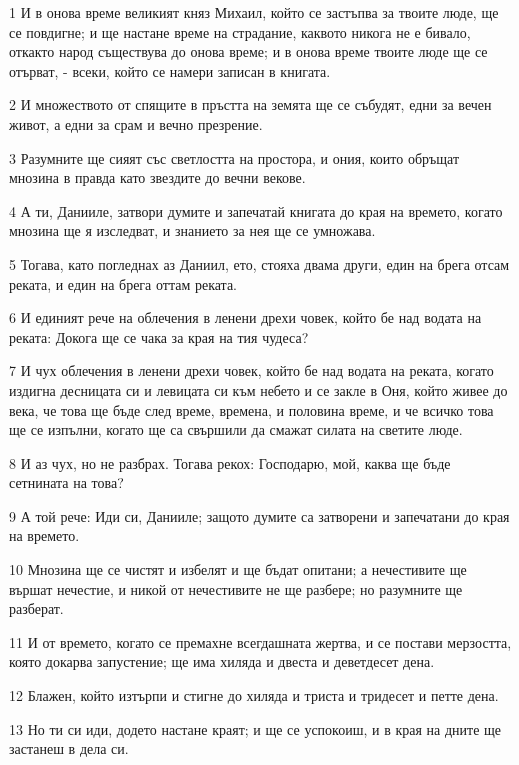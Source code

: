\par 1 И в онова време великият княз Михаил, който се застъпва за твоите люде, ще се повдигне; и ще настане време на страдание, каквото никога не е бивало, откакто народ съществува до онова време; и в онова време твоите люде ще се отърват, - всеки, който се намери записан в книгата.
\par 2 И множеството от спящите в пръстта на земята ще се събудят, едни за вечен живот, а едни за срам и вечно презрение.
\par 3 Разумните ще сияят със светлостта на простора, и ония, които обръщат мнозина в правда като звездите до вечни векове.
\par 4 А ти, Данииле, затвори думите и запечатай книгата до края на времето, когато мнозина ще я изследват, и знанието за нея ще се умножава.
\par 5 Тогава, като погледнах аз Даниил, ето, стояха двама други, един на брега отсам реката, и един на брега оттам реката.
\par 6 И единият рече на облечения в ленени дрехи човек, който бе над водата на реката: Докога ще се чака за края на тия чудеса?
\par 7 И чух облечения в ленени дрехи човек, който бе над водата на реката, когато издигна десницата си и левицата си към небето и се закле в Оня, който живее до века, че това ще бъде след време, времена, и половина време, и че всичко това ще се изпълни, когато ще са свършили да смажат силата на светите люде.
\par 8 И аз чух, но не разбрах. Тогава рекох: Господарю, мой, каква ще бъде сетнината на това?
\par 9 А той рече: Иди си, Данииле; защото думите са затворени и запечатани до края на времето.
\par 10 Мнозина ще се чистят и избелят и ще бъдат опитани; а нечестивите ще вършат нечестие, и никой от нечестивите не ще разбере; но разумните ще разберат.
\par 11 И от времето, когато се премахне всегдашната жертва, и се постави мерзостта, която докарва запустение; ще има хиляда и двеста и деветдесет дена.
\par 12 Блажен, който изтърпи и стигне до хиляда и триста и тридесет и петте дена.
\par 13 Но ти си иди, додето настане краят; и ще се успокоиш, и в края на дните ще застанеш в дела си.

